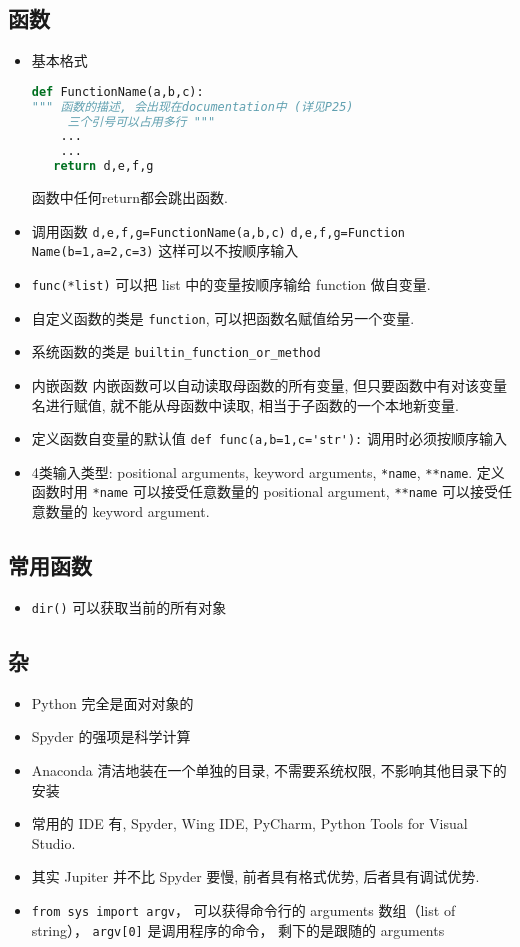 \subsection{函数}
\begin{itemize}
\item 基本格式
\begin{lstlisting}[language=python]
def FunctionName(a,b,c):
""" 函数的描述, 会出现在documentation中 (详见P25)
     三个引号可以占用多行 """
    ...
    ...
   return d,e,f,g
\end{lstlisting}

函数中任何return都会跳出函数.

\item 调用函数
\verb`d,e,f,g=FunctionName(a,b,c)`
\verb`d,e,f,g=Function Name(b=1,a=2,c=3)`  这样可以不按顺序输入
\item \verb`func(*list)` 可以把 list 中的变量按顺序输给 function 做自变量.

\item 自定义函数的类是 \verb`function`, 可以把函数名赋值给另一个变量.
\item 系统函数的类是 \verb`builtin_function_or_method`

\item 内嵌函数
内嵌函数可以自动读取母函数的所有变量, 但只要函数中有对该变量名进行赋值, 就不能从母函数中读取, 相当于子函数的一个本地新变量.

\item 定义函数自变量的默认值  \verb`def func(a,b=1,c='str'):` 调用时必须按顺序输入
\item 4类输入类型: positional arguments, keyword arguments, \verb`*name`, \verb`**name`. 定义函数时用 \verb`*name` 可以接受任意数量的 positional argument, \verb`**name` 可以接受任意数量的 keyword argument.
\end{itemize}

\subsection{常用函数}
\begin{itemize}
\item \verb`dir()` 可以获取当前的所有对象
\end{itemize}

\subsection{杂}
\begin{itemize}
\item Python 完全是面对对象的
\item Spyder 的强项是科学计算
\item Anaconda 清洁地装在一个单独的目录, 不需要系统权限, 不影响其他目录下的安装
\item 常用的 IDE 有, Spyder, Wing IDE, PyCharm, Python Tools for Visual Studio.
\item 其实 Jupiter 并不比 Spyder 要慢, 前者具有格式优势, 后者具有调试优势.
\item \verb`from sys import argv`， 可以获得命令行的 arguments 数组（list of string）， \verb`argv[0]` 是调用程序的命令， 剩下的是跟随的 arguments
\end{itemize}
